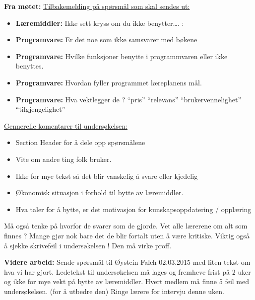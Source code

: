 \hspace{-17pt}\textbf{Fra møtet:}\newline
\hspace{-17pt}\underline {Tilbakemelding på spørsmål som skal sendes ut:}

\begin{itemize}
\item \textbf{Læremiddler:} Ikke sett kryss om du ikke benytter…. :
\item \textbf{Programvare:} Er det noe som ikke samsvarer med bøkene
\item \textbf{Programvare:} Hvilke funksjoner benytte i programmvaren eller ikke benyttes.
\item \textbf{Programvare:} Hvordan fyller programmet læreplanens mål.
\item \textbf{Programvare:} Hva vektlegger de ? “pris” “relevans” “brukervennelighet” “tilgjengelighet”
\end{itemize}

\hspace{-17pt}\underline {Gennerelle komentarer til undersøkelsen:}

\begin{itemize}
\item Section Header for å dele opp spørsmålene
\item Vite om andre ting folk bruker.
\item Ikke for mye tekst så det blir vanskelig å svare eller kjedelig
\item Økonomisk situasjon i forhold til bytte av læremiddler.
\item Hva taler for å bytte, er det motivasjon for kunskapsoppdatering / opplæring
\end{itemize}

\hspace{-17pt}Må også tenke på hvorfor de svarer som de gjorde. Vet alle lærerene om alt som finnes ? Mange gjør nok bare det de blir fortalt uten å være kritiske.\newline
Viktig også å sjekke skrivefeil i undersøkelsen ! Den må virke proff.\newline

\vspace{20pt}

\hspace{-17pt}\textbf{Videre arbeid:}\newline
Sende spørsmål til Øystein Falch 02.03.2015 med liten tekst om hva vi har gjort.\newline
Ledetekst til undersøkelsen må lages og fremheve frist på 2 uker og ikke for mye vekt på bytte av læremiddler.\newline
Hvert medlem må finne 5 feil med undersøkelsen. (for å utbedre den) \newline
Ringe lærere for intervju denne uken.\newline

